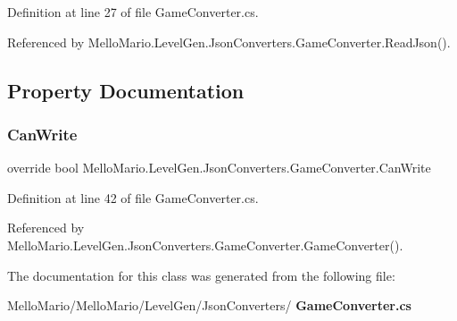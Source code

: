 Definition at line 27 of file Game\+Converter.\+cs.



Referenced by Mello\+Mario.\+Level\+Gen.\+Json\+Converters.\+Game\+Converter.\+Read\+Json().



\subsection{Property Documentation}
\mbox{\label{classMelloMario_1_1LevelGen_1_1JsonConverters_1_1GameConverter_a216146afe21ee8664533490544301a6b}} 
\subsubsection{Can\+Write}
{\footnotesize\ttfamily override bool Mello\+Mario.\+Level\+Gen.\+Json\+Converters.\+Game\+Converter.\+Can\+Write\hspace{0.3cm}{\ttfamily [get]}}



Definition at line 42 of file Game\+Converter.\+cs.



Referenced by Mello\+Mario.\+Level\+Gen.\+Json\+Converters.\+Game\+Converter.\+Game\+Converter().



The documentation for this class was generated from the following file\+:\begin{DoxyCompactItemize}
\item 
Mello\+Mario/\+Mello\+Mario/\+Level\+Gen/\+Json\+Converters/\textbf{ Game\+Converter.\+cs}\end{DoxyCompactItemize}
